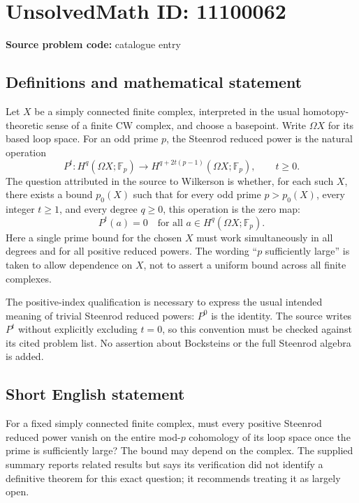 \documentclass[11pt]{article}
\newcommand{\F}{\mathbb{F}}
\begin{document}
\section*{UnsolvedMath ID: 11100062}
\textbf{Source problem code:} catalogue entry
\subsection{Definitions and mathematical statement}
Let $X$ be a simply connected finite complex, interpreted in the usual homotopy-theoretic sense of a finite CW complex, and choose a basepoint. Write $\Omega X$ for its based loop space. For an odd prime $p$, the Steenrod reduced power is the natural operation
\[
 P^t:H^q(\Omega X;\F_p)\longrightarrow
 H^{q+2t(p-1)}(\Omega X;\F_p),\qquad t\geq0.
\]
The question attributed in the source to Wilkerson is whether, for each such $X$, there exists a bound $p_0(X)$ such that for every odd prime $p>p_0(X)$, every integer $t\geq1$, and every degree $q\geq0$, this operation is the zero map:
\[
 P^t(a)=0\quad\text{for all }a\in H^q(\Omega X;\F_p).
\]
Here a single prime bound for the chosen $X$ must work simultaneously in all degrees and for all positive reduced powers. The wording ``$p$ sufficiently large'' is taken to allow dependence on $X$, not to assert a uniform bound across all finite complexes.

The positive-index qualification is necessary to express the usual intended meaning of trivial Steenrod reduced powers: $P^0$ is the identity. The source writes $P^t$ without explicitly excluding $t=0$, so this convention must be checked against its cited problem list. No assertion about Bocksteins or the full Steenrod algebra is added.
\subsection{Short English statement}
For a fixed simply connected finite complex, must every positive Steenrod reduced power vanish on the entire mod-$p$ cohomology of its loop space once the prime is sufficiently large? The bound may depend on the complex. The supplied summary reports related results but says its verification did not identify a definitive theorem for this exact question; it recommends treating it as largely open.
\end{document}
